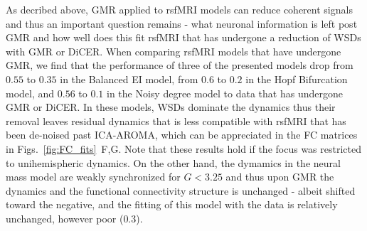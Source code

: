 \documentclass[oneside]{zHenriquesLab-StyleBioRxiv}
\begin{document}
As decribed above, GMR applied to rsfMRI models can reduce coherent signals and thus an important question remains - what neuronal information is left post GMR and how well does this fit rsfMRI that has undergone a reduction of WSDs with GMR or DiCER. When comparing rsfMRI models that have undergone GMR, we find that the performance of three of the presented models drop from $0.55$ to $0.35$ in the Balanced EI model, from $0.6$ to $0.2$ in the Hopf Bifurcation model, and $0.56$ to $0.1$ in the Noisy degree model to data that has undergone GMR or DiCER. In these models, WSDs dominate the dynamics thus their removal leaves residual dynamics that is less compatible with rsfMRI that has been de-noised past ICA-AROMA, which can be appreciated in the FC matrices in Figs.~\ref{fig:FC_fits}~F,G. Note that these results hold if the focus was restricted to unihemispheric dynamics. On the other hand, the dymamics in the neural mass model are weakly synchronized for $G<3.25$ and thus upon GMR the dynamics and the functional connectivity structure is unchanged - albeit shifted toward the negative, and the fitting of this model with the data is relatively unchanged, however poor ($0.3$).
\end{document}

